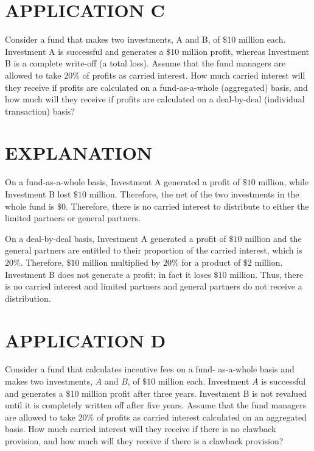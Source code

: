 \documentclass[11pt]{article}
\begin{document}
\section*{APPLICATION C}
Consider a fund that makes two investments, A and B, of $\$ 10$ million each. Investment A is successful and generates a $\$ 10$ million profit, whereas Investment B is a complete write-off (a total loss). Assume that the fund managers are allowed to take $20 \%$ of profits as carried interest. How much carried interest will they receive if profits are calculated on a fund-as-a-whole (aggregated) basis, and how much will they receive if profits are calculated on a deal-by-deal (individual transaction) basis?

\section*{EXPLANATION}
On a fund-as-a-whole basis, Investment A generated a profit of $\$ 10$ million, while Investment B lost $\$ 10$ million. Therefore, the net of the two investments in the whole fund is $\$ 0$. Therefore, there is no carried interest to distribute to either the limited partners or general partners.

On a deal-by-deal basis, Investment A generated a profit of $\$ 10$ million and the general partners are entitled to their proportion of the carried interest, which is $20 \%$. Therefore, $\$ 10$ million multiplied by $20 \%$ for a product of $\$ 2$ million. Investment B does not generate a profit; in fact it loses $\$ 10$ million. Thus, there is no carried interest and limited partners and general partners do not receive a distribution.

\section*{APPLICATION D}
Consider a fund that calculates incentive fees on a fund- as-a-whole basis and makes two investments, $A$ and $B$, of $\$ 10$ million each. Investment $A$ is successful and generates a $\$ 10$ million profit after three years. Investment B is not revalued until it is completely written off after five years. Assume that the fund managers are allowed to take $20 \%$ of profits as carried interest calculated on an aggregated basis. How much carried interest will they receive if there is no clawback provision, and how much will they receive if there is a clawback provision?
\end{document}
